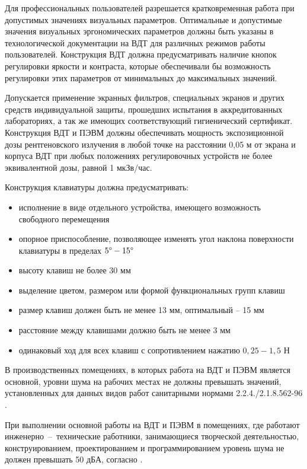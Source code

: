 Для профессиональных пользователей разрешается кратковременная работа при допустимых
значениях визуальных параметров. Оптимальные и допустимые значения визуальных
эргономических параметров должны быть указаны в технологической документации на
ВДТ для различных режимов работы пользователей. Конструкция ВДТ должна предусматривать
наличие кнопок регулировки яркости и контраста, которые обеспечивали бы возможность
регулировки этих параметров от минимальных до максимальных значений.

Допускается применение экранных фильтров, специальных экранов и других средств
индивидуальной защиты, прошедших испытания в аккредитованных лабораториях, а так
же имеющих соответствующий гигиенический сертификат. Конструкция ВДТ и ПЭВМ должны
обеспечивать мощность экспозиционной дозы рентгеновского излучения в любой точке
на расстоянии 0,05 м от экрана и корпуса ВДТ при любых положениях регулировочных
устройств не более эквивалентной дозы, равной 1 мкЗв/час.

Конструкция клавиатуры должна предусматривать:

\begin{itemize}
    \item исполнение в виде отдельного устройства, имеющего возможность свободного
            перемещения
    \item опорное приспособление, позволяющее изменять угол наклона поверхности
            клавиатуры в пределах $5 \degree - 15 \degree$
    \item высоту клавиш не более 30 мм
    \item выделение цветом, размером или формой функциональных групп клавиш
    \item размер клавиш должен быть не менее 13 мм, оптимальный – 15 мм
    \item расстояние между клавишами должно быть не менее 3 мм
    \item одинаковый ход для всех клавиш с сопротивлением нажатию $0,25 - 1,5$ Н
\end{itemize}


В производственных помещениях, в которых работа на ВДТ и ПЭВМ является основной,
уровни шума на рабочих местах не должны превышать значений, установленных для
данных видов работ санитарными нормами 2.2.4./2.1.8.562-96
\cite{ecology_sanitary_norm_562_96}.

При выполнении основной работы на ВДТ и ПЭВМ в помещениях, где работают
инженерно~--~технические работники, занимающиеся творческой деятельностью, конструированием,
проектированием и программированием уровень шума не должен превышать 50 дБА,
согласно \cite[табл. 2]{ecology_sanitary_norm_562_96}.

